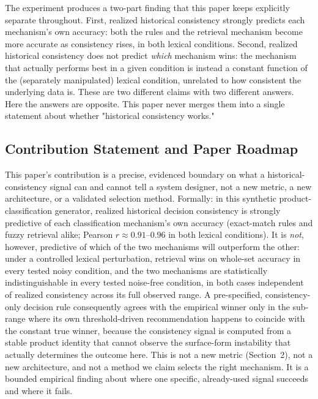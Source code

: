 \documentclass[11pt]{article}
\begin{document}
The experiment produces a two-part finding that this paper keeps explicitly
separate throughout. First, realized historical consistency strongly predicts
each mechanism's own accuracy: both the rules and the retrieval mechanism
become more accurate as consistency rises, in both lexical conditions.
Second, realized historical consistency does not predict \emph{which}
mechanism wins: the mechanism that actually performs best in a given
condition is instead a constant function of the (separately manipulated)
lexical condition, unrelated to how consistent the underlying data is. These
are two different claims with two different answers. Here the answers are
opposite. This paper never merges them into a single statement about whether
"historical consistency works."

\subsection{Contribution Statement and Paper Roadmap}
\label{sec:contribution-roadmap}

This paper's contribution is a precise, evidenced boundary on what a
historical-consistency signal can and cannot tell a system designer, not a
new metric, a new architecture, or a validated selection method. Formally: in
this synthetic product-classification generator, realized historical decision
consistency is strongly predictive of each classification mechanism's own
accuracy (exact-match rules and fuzzy retrieval alike; Pearson $r\approx
0.91$--$0.96$ in both lexical conditions). It is \emph{not}, however,
predictive of which of the two mechanisms will outperform the other: under a controlled
lexical perturbation, retrieval wins on whole-set accuracy in every tested
noisy condition, and the two mechanisms are statistically indistinguishable
in every tested noise-free condition, in both cases independent of realized
consistency across its full observed range. A pre-specified,
consistency-only decision rule consequently agrees with the empirical winner
only in the sub-range where its own threshold-driven recommendation happens
to coincide with the constant true winner, because the consistency signal is
computed from a stable product identity that cannot observe the surface-form
instability that actually determines the outcome here. This is not a new
metric (Section~2), not a new architecture, and not a method we claim
selects the right mechanism. It is a bounded empirical finding about where
one specific, already-used signal succeeds and where it fails.
\end{document}
